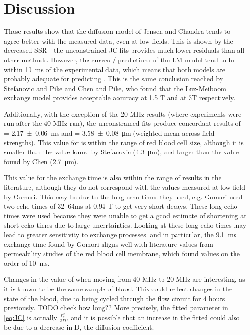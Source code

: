 \section{Discussion}
These results show that the diffusion model of Jensen and Chandra tends to agree better with the measured data, even at low fields.
This is shown by the decreased SSR - the unconstrained JC fits provides much lower residuals than all other methods.
However, the curves / predictions of the LM model tend to be within \SI{10}{ms} of the experimental data, which means that both models are probably adequate for predicting \Ttwo.
This is the same conclusion reached by Stefanovic and Pike and Chen and Pike, who found that the Luz-Meiboom exchange model provides acceptable accuracy at 1.5 T and at 3T respectively.

Additionally, with the exception of the 20 MHz results (where experiments were run after the 40 MHz run), the unconstrained fits produce concordant results of \Texc = \SI{2.17\pm0.06}{ms} and \rc = \SI{3.58 \pm 0.08}{\micro\metre} (weighted mean across field strengths).
This value for \rc is within the range of red blood cell size, although it is smaller than the value found by Stefanovic (\SI{4.3}{\micro\metre})\cite{StefanovicHumanwholebloodrelaxometry2004}, and larger than the value found by Chen (\SI{2.7}{\micro\metre})\cite{ChenHumanwholeblood2009}.

This value for the exchange time is also within the range of results in the literature, although they do not correspond with the values measured at low field by Gomori\cite{GomoriNMRRelaxationTimes1987}.
This may be due to the long echo times they used, e.g. Gomori used two echo times of \SIlist{32}{64}{ms} at 0.94 T to get very short \Ttwo decays.
These long echo times were used because they were unable to get a good estimate of \Ttwo shortening at short echo times due to large uncertainties.
Looking at these long echo times may lead to greater sensitivity to exchange processes, and in particular, the \SI{9.1}{ms} exchange time found by Gomori aligns well with literature values from permeability studies of the red blood cell membrane, which found values on the order of \SI{10}{ms}\cite{Herbstreviewwaterdiffusion1989}.

Changes in the value of \rc when moving from 40 MHz to 20 MHz are interesting, as it is known to be the same sample of blood.
This could reflect changes in the state of the blood, due to being cycled through the flow circuit for 4 hours previously. TODO check how long??
More precisely, the fitted parameter in \autoref{eq:JC} is actually $\mathit{\frac{r_c^2}{2D}}$, and it is possible that an increase in the fitted \rc could also be due to a decrease in D, the diffusion coefficient.

